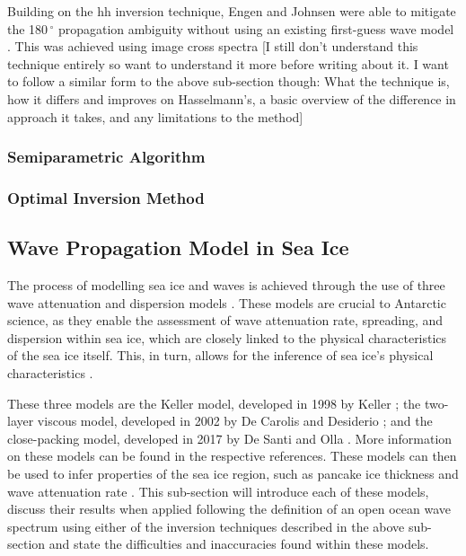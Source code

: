 Building on the \ac{hh} inversion technique, Engen and Johnsen were able to mitigate the 180\,$^{\circ}$ propagation ambiguity without using an existing first-guess wave model \cite{Engen1995}. This was achieved using image cross spectra [I still don't understand this technique entirely so want to understand it more before writing about it. I want to follow a similar form to the above sub-section though: What the technique is, how it differs and improves on Hasselmann's, a basic overview of the difference in approach it takes, and any limitations to the method]

\subsubsection{Semiparametric Algorithm} \label{subsubsec:litReview.sarCharac.oceanWaveInversion.Mastenbroek}

\subsubsection{Optimal Inversion Method} \label{subsubsec:litReview.sarCharac.oceanWaveInversion.Portabella}

\subsection{Wave Propagation Model in Sea Ice} \label{subsec:litReview.sarCharac.seaIceWaveModelling}

The process of modelling sea ice and waves is achieved through the use of three wave attenuation and dispersion models \cite{DeCarolis2021, DeSanti2018}. These models are crucial to Antarctic science, as they enable the assessment of wave attenuation rate, spreading, and dispersion within sea ice, which are closely linked to the physical characteristics of the sea ice itself. This, in turn, allows for the inference of sea ice's physical characteristics \cite{DeCarolis2002}.

These three models are the Keller model, developed in 1998 by Keller \cite{Keller1998}; the two-layer viscous model, developed in 2002 by De Carolis and Desiderio \cite{DeCarolis2002}; and the close-packing model, developed in 2017 by De Santi and Olla \cite{DeSanti2017}. More information on these models can be found in the respective references. These models can then be used to infer properties of the sea ice region, such as pancake ice thickness and wave attenuation rate \cite{Aulicino2019}. This sub-section will introduce each of these models, discuss their results when applied following the definition of an open ocean wave spectrum using either of the inversion techniques described in the above sub-section and state the difficulties and inaccuracies found within these models.

